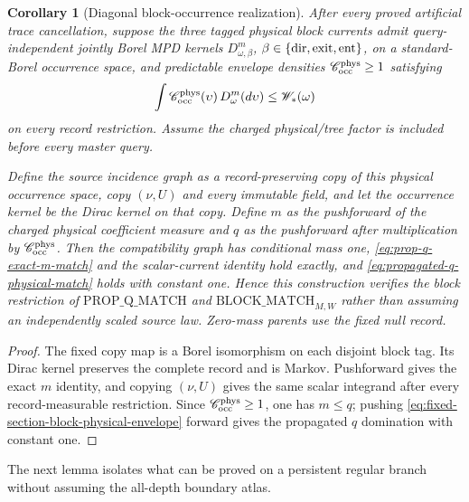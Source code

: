 \documentclass[11pt]{article}
\newtheorem{corollary}[theorem]{Corollary}
\begin{document}
\begin{corollary}[Diagonal block-occurrence realization]
\label{cor:fixed-section-diagonal-block-match}
After every proved artificial trace cancellation, suppose the three tagged
physical block currents admit query-independent jointly Borel MPD kernels
$D_{\omega,\beta}^m$, $\beta\in\{{\rm dir},{\rm exit},{\rm ent}\}$, on a
standard-Borel occurrence space, and predictable envelope densities
$\mathscr C_{\rm occ}^{\rm phys}\ge1$ satisfying
\begin{equation}
\label{eq:fixed-section-block-physical-envelope}
 \int\mathscr C_{\rm occ}^{\rm phys}(\upsilon)
      \,D_\omega^m(d\upsilon)\le\mathscr W_*(\omega)
\end{equation}
on every record restriction.  Assume the charged physical/tree factor is
included before every master query.

Define the source incidence graph as a record-preserving copy of this
physical occurrence space, copy $(\nu,U)$ and every immutable field, and let
the occurrence kernel be the Dirac kernel on that copy.  Define $m$ as the
pushforward of the charged physical coefficient measure and $q$ as the
pushforward after multiplication by
$\mathscr C_{\rm occ}^{\rm phys}$.  Then the compatibility graph has
conditional mass one,
\eqref{eq:prop-q-exact-m-match} and the scalar-current identity hold exactly,
and \eqref{eq:propagated-q-physical-match} holds with constant one.  Hence
this construction verifies the block restriction of
$\mathrm{PROP\_Q\_MATCH}$ and $\mathrm{BLOCK\_MATCH}_{M,W}$ rather than
assuming an independently scaled source law.  Zero-mass parents use the
fixed null record.
\end{corollary}

\begin{proof}
The fixed copy map is a Borel isomorphism on each disjoint block tag.  Its
Dirac kernel preserves the complete record and is Markov.  Pushforward gives
the exact $m$ identity, and copying $(\nu,U)$ gives the same scalar integrand
after every record-measurable restriction.  Since
$\mathscr C_{\rm occ}^{\rm phys}\ge1$, one has $m\le q$; pushing
\eqref{eq:fixed-section-block-physical-envelope} forward gives the propagated
$q$ domination with constant one.
\end{proof}

The next lemma isolates what can be proved on a persistent regular branch
without assuming the all-depth boundary atlas.
\end{document}
